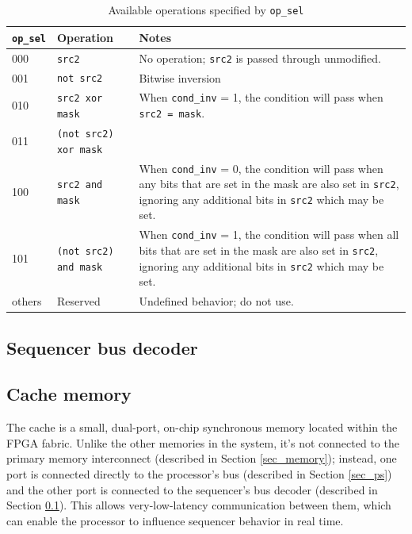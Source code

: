 \begin{table}
  \centering
  \caption{Available operations specified by \lstinline|op_sel|}
  \label{tab_op_sel}
  \begin{tabular}{| m{1.8cm} | m{2cm} | m{8.5cm} |} 
    \hline
    \textbf{\lstinline|op_sel|} & \textbf{Operation} & \textbf{Notes} \\
    \hline
    000 & \lstinline|src2| & No operation; \lstinline|src2| is passed through unmodified. \\
    \hline
    001 & \lstinline|not src2| & Bitwise inversion \\
    \hline
    010 & \lstinline|src2 xor mask| & When \lstinline|cond_inv| = 1, the condition will pass when \lstinline|src2 = mask|. \\
    \hline
    011 & \lstinline|(not src2) xor mask| & \\
    \hline
    100 & \lstinline|src2 and mask| & When \lstinline|cond_inv| = 0, the condition will pass when any bits that are set in the mask are also set in \lstinline|src2|, ignoring any additional bits in \lstinline|src2| which may be set. \\
    \hline
    101 & \lstinline|(not src2) and mask| & When \lstinline|cond_inv| = 1, the condition will pass when all bits that are set in the mask are also set in \lstinline|src2|, ignoring any additional bits in \lstinline|src2| which may be set. \\
    \hline
    others & Reserved & Undefined behavior; do not use. \\
    \hline
  \end{tabular}
\end{table}

\subsection{Sequencer bus decoder} \label{sec_bus_decoder}


\subsection{Cache memory} \label{sec_cache}

The cache is a small, dual-port, on-chip synchronous memory located within the FPGA fabric. Unlike the other memories in the system, it's not connected to the primary memory interconnect (described in Section \ref{sec_memory}); instead, one port is connected directly to the processor's bus (described in Section \ref{sec_ps}) and the other port is connected to the sequencer's bus decoder (described in Section \ref{sec_bus_decoder}). This allows very-low-latency communication between them, which can enable the processor to influence sequencer behavior in real time. 

